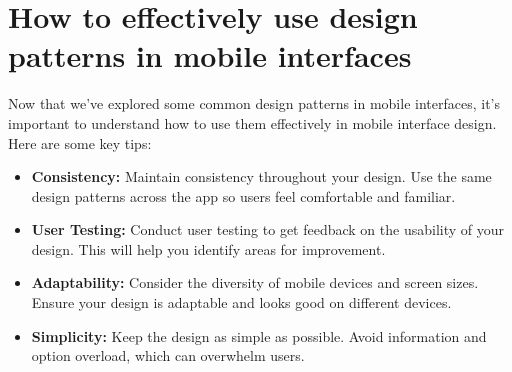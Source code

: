 \documentclass{article}
\begin{document}
\section{How to effectively use design patterns in mobile interfaces}
Now that we've explored some common design patterns in mobile interfaces, it's important to understand how to use them effectively in mobile interface design. Here are some key tips:

\begin{itemize}
\item \textbf{Consistency:} Maintain consistency throughout your design. Use the same design patterns across the app so users feel comfortable and familiar.

\item \textbf{User Testing:} Conduct user testing to get feedback on the usability of your design. This will help you identify areas for improvement.

\item \textbf{Adaptability:} Consider the diversity of mobile devices and screen sizes. Ensure your design is adaptable and looks good on different devices.

\item \textbf{Simplicity:} Keep the design as simple as possible. Avoid information and option overload, which can overwhelm users.
\end{itemize}
\end{document}
